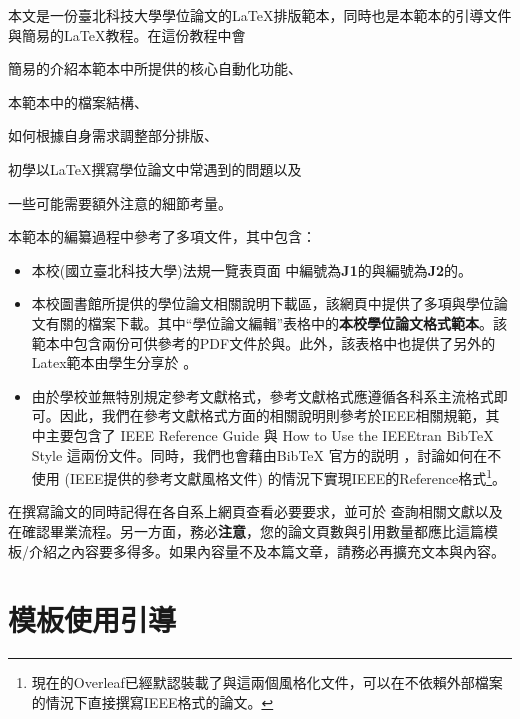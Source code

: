 \documentclass[12pt]{report}
\theoremstyle{plain}
\renewcommand{\schoolzh}{國立臺北科技大學}
\begin{document}
本文是一份臺北科技大學學位論文的\LaTeX{}排版範本，同時也是本範本的引導文件與簡易的\LaTeX{}教程。在這份教程中會
\begin{enumerate*}
    \item 簡易的介紹本範本中所提供的核心自動化功能、
    \item 本範本中的檔案結構、
    \item 如何根據自身需求調整部分排版、
    \item 初學以\LaTeX{}撰寫學位論文中常遇到的問題以及
    \item 一些可能需要額外注意的細節考量。
\end{enumerate*}
本範本的編纂過程中參考了多項文件，其中包含：
\begin{itemize}
    \item 本校(\schoolzh)法規一覽表頁面 \cite{ntutrule} 中編號為\textbf{J1}的與編號為\textbf{J2}的。
    \item 本校圖書館所提供的學位論文相關說明下載區\cite{ntutlibdown}，該網頁中提供了多項與學位論文有關的檔案下載。其中``學位論文編輯''表格中的\textbf{本校學位論文格式範本}。該範本中包含兩份可供參考的PDF文件於與。此外，該表格中也提供了另外的Latex範本由學生分享於 。
    \item 由於學校並無特別規定參考文獻格式，參考文獻格式應遵循各科系主流格式即可。因此，我們在參考文獻格式方面的相關說明則參考於IEEE相關規範，其中主要包含了 IEEE Reference Guide \cite{ieeerefguide} 與 How to Use the IEEEtran BibTeX Style \cite{ieeebib}這兩份文件。同時，我們也會藉由BibTeX 官方的説明 \cite{bibtex}，討論如何在不使用 (IEEE提供的參考文獻風格文件) 的情況下實現IEEE的Reference格式\footnote{現在的Overleaf已經默認裝載了與這兩個風格化文件，可以在不依賴外部檔案的情況下直接撰寫IEEE格式的論文。}。
\end{itemize}
在撰寫論文的同時記得在各自系上網頁查看必要要求，並可於 \cite{ntutsheet} 查詢相關文獻以及在\cite{ntutlibcommit}確認畢業流程。另一方面，務必\textbf{注意}，您的論文頁數與引用數量都應比這篇模板/介紹之內容要多得多。如果內容量不及本篇文章，請務必再擴充文本與內容。

\section{模板使用引導}
\end{document}
